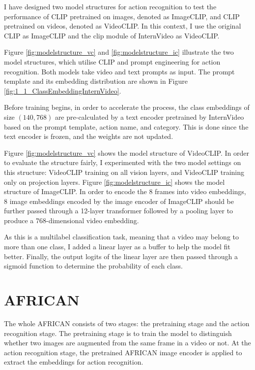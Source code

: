I have designed two model structures for action recognition to test the performance of CLIP pretrained on images, denoted as ImageCLIP, and CLIP pretrained on videos, denoted as VideoCLIP. In this context, I use the original CLIP \parencite{radford2021learning} as ImageCLIP and the clip module of InternVideo \parencite{wang2022internvideo} as VideoCLIP. 

Figure \ref{fig:modelstructure_vc} and \ref{fig:modelstructure_ic} illustrate the two model structures, which utilise CLIP and prompt engineering for action recognition. Both models take video and text prompts as input. The prompt template and its embedding distribution are shown in Figure \ref{fig:1_1_ClassEmbeddingInternVideo}. 

Before training begins, in order to accelerate the process, the class embeddings of size $(140, 768)$ are pre-calculated by a text encoder pretrained by InternVideo based on the prompt template, action name, and category. This is done since the text encoder is frozen, and the weights are not updated. 

Figure \ref{fig:modelstructure_vc} shows the model structure of VideoCLIP. In order to evaluate the structure fairly, I experimented with the two model settings on this structure: VideoCLIP training on all vision layers, and VideoCLIP training only on projection layers. Figure \ref{fig:modelstructure_ic} shows the model structure of ImageCLIP. In order to encode the 8 frames into video embeddings, 8 image embeddings encoded by the image encoder of ImageCLIP should be further passed through a 12-layer transformer followed by a pooling layer to produce a 768-dimensional video embedding.

As this is a multilabel classification task, meaning that a video may belong to more than one class, I added a linear layer as a buffer to help the model fit better. Finally, the output logits of the linear layer are then passed through a sigmoid function to determine the probability of each class. 

\section{AFRICAN}
The whole AFRICAN consists of two stages: the pretraining stage and the action recognition stage. The pretraining stage is to train the model to distinguish whether two images are augmented from the same frame in a video or not. At the action recognition stage, the pretrained AFRICAN image encoder is applied to extract the embeddings for action recognition. 


